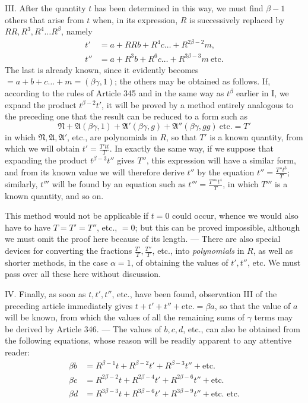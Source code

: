 III. After the quantity \(t\) has been determined in this way, we must find \(\beta-1\) others that arise from \(t\) when, in its expression, \(R\) is successively replaced by \(RR,\allowbreak R^3,\allowbreak R^4\ldots R^\beta\), namely \[\begin{aligned}t'&=a+RRb+R^4c\ldots+R^{2\beta-2}m,\\t''&=a+R^3b+R^6c\ldots+R^{3\beta-3}m\ \text{etc.}\end{aligned}\] The last is already known, since it evidently becomes \(=a+b+c\ldots+m=(\beta\gamma,1)\); the others may be obtained as follows. If, according to the rules of Article 345 and in the same way as \(t^\beta\) earlier in I, we expand the product \(t^{\beta-2}t'\), it will be proved by a method entirely analogous to the preceding one that the result can be reduced to a form such as
\[\mathfrak{N}+\mathfrak{A}(\beta\gamma,1)+\mathfrak{A}'(\beta\gamma,g)+\mathfrak{A}''(\beta\gamma,gg)\ \text{etc.}=T'\] in which \(\mathfrak{N},\allowbreak \mathfrak{A},\allowbreak \mathfrak{A}'\), etc., are polynomials in \(R\), so that \(T'\) is a known quantity, from which we will obtain \(t'=\frac{T'tt}{T}\). In exactly the same way, if we suppose that expanding the product \(t^{\beta-3}t''\) gives \(T''\), this expression will have a similar form, and from its known value we will therefore derive \(t''\) by the equation \(t''=\frac{T''t^3}{T}\); similarly, \(t'''\) will be found by an equation such as \(t'''=\frac{T''''t^4}{T}\), in which \(T'''\) is a known quantity, and so on.

This method would not be applicable if \(t=0\) could occur, whence we would also have to have \(T=T'=T''\), etc., \(=0\); but this can be proved impossible, although we must omit the proof here because of its length. — There are also special devices for converting the fractions \(\frac{T'}T,\allowbreak \frac{T''}T\), etc., into \textit{polynomials} in \(R\), as well as shorter methods, in the case \(\alpha=1\), of obtaining the values of \(t',\allowbreak t''\), etc. We must pass over all these here without discussion.

IV. Finally, as soon as \(t,\allowbreak t',\allowbreak t''\), etc., have been found, observation III of the preceding article immediately gives \(t+t'+t''+\text{etc.}=\beta a\), so that the value of \(a\) will be known, from which the values of all the remaining sums of \(\gamma\) terms may be derived by Article 346. — The values of \(b,\allowbreak c,\allowbreak d\), etc., can also be obtained from the following equations, whose reason will be readily apparent to any attentive reader: \[\begin{aligned}\beta b&=R^{\beta-1}t+R^{\beta-2}t'+R^{\beta-3}t''+\text{etc.}\\\beta c&=R^{2\beta-2}t+R^{2\beta-4}t'+R^{2\beta-6}t''+\text{etc.}\\\beta d&=R^{3\beta-3}t+R^{3\beta-6}t'+R^{3\beta-9}t''+\text{etc. etc.}\end{aligned}\]

